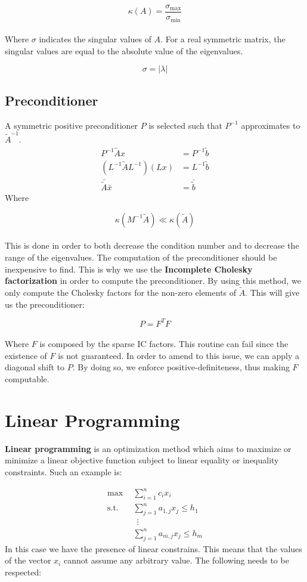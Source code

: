 \documentclass{article}
\begin{document}
\[ \kappa(A) = \frac{\sigma_{\max}}{\sigma_{\min}} \] \\
Where $\sigma$ indicates the singular values of $A$. For a real symmetric matrix, the singular values are equal to the absolute value of the eigenvalues.

\[ \sigma = |\lambda| \]

\subsection{Preconditioner}
A symmetric positive preconditioner $P$ is selected such that $P^{-1}$ approximates to $\tilde{A}^{-1}$.
\begin{align*}
	P^{-1}\tilde{A}x & = P^{-1}\tilde{b} \\
	(L^{-1}\tilde{A}L^{-1})(Lx) & = L^{-1}\tilde{b} \\
	\bar{\tilde{A}}\bar{x} & = \bar{\tilde{b}}
\end{align*}
Where

\[ \kappa(M^{-1}\tilde{A}) \ll \kappa(\tilde{A}) \]\\
This is done in order to both decrease the condition number and to decrease the range of the eigenvalues.
The computation of the preconditioner should be inexpensive to find. This is why we use the \textbf{Incomplete Cholesky factorization} in order to compute the preconditioner. By using this method, we only compute the Cholesky factors for the non-zero elements of $\tilde{A}$. This will give us the preconditioner:

\[ P = F^TF \] \\
Where $F$ is composed by the sparse IC factors. This routine can fail since the existence of $F$ is not guaranteed. In order to amend to this issue, we can apply a diagonal shift to $P$. By doing so, we enforce positive-definiteness, thus making $F$ computable.

\section{Linear Programming}
\textbf{Linear programming} is an optimization method which aims to maximize or minimize a linear objective function subject to linear equality or inequality constraints. Such an example is:

\begin{align*}
	\max~~ & \sum_{i = 1}^n c_ix_i \\
	\text{s.t.}~~ & \sum_{j = 1}^n a_{1,j}x_j \leq h_1 \\
	~~&~~ \vdots \\
	~~& \sum_{j = 1}^n a_{m,j}x_j \leq h_m
\end{align*}
In this case we have the presence of linear constrains. This means that the values of the vector $x_i$ cannot assume any arbitrary value. The following needs to be respected:
\end{document}
